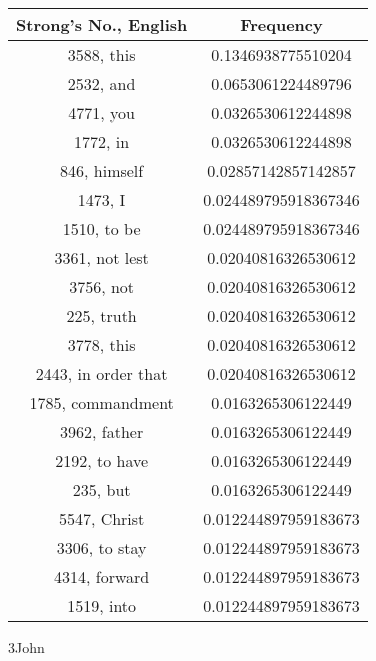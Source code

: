 \documentclass[12pt,letterpaper]{article}
\begin{document}
 \begin{longtable}{|c|c|}
\hline
 Strong's No., English & Frequency \\ \hline  
3588, this & 0.1346938775510204\\ \hline 
 2532, and & 0.0653061224489796\\ \hline 
 4771, you & 0.0326530612244898\\ \hline 
 1772, in & 0.0326530612244898\\ \hline 
 846, himself & 0.02857142857142857\\ \hline 
 1473, I & 0.024489795918367346\\ \hline 
 1510, to be & 0.024489795918367346\\ \hline 
 3361, not lest & 0.02040816326530612\\ \hline 
 3756, not & 0.02040816326530612\\ \hline 
 225, truth & 0.02040816326530612\\ \hline 
 3778, this & 0.02040816326530612\\ \hline 
 2443, in order that & 0.02040816326530612\\ \hline 
 1785, commandment & 0.0163265306122449\\ \hline 
 3962, father & 0.0163265306122449\\ \hline 
 2192, to have & 0.0163265306122449\\ \hline 
 235, but & 0.0163265306122449\\ \hline 
 5547, Christ & 0.012244897959183673\\ \hline 
 3306, to stay & 0.012244897959183673\\ \hline 
 4314, forward & 0.012244897959183673\\ \hline 
 1519, into & 0.012244897959183673\\ \hline 
\end{longtable} 
 

3John
\end{document}
